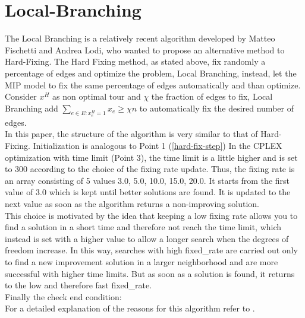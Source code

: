\section{Local-Branching}
The Local Branching is a relatively recent algorithm developed by Matteo Fischetti and Andrea Lodi, who wanted to propose an alternative method to Hard-Fixing. The Hard Fixing method, as stated above, fix randomly a percentage of edges and optimize the problem, Local Branching, instead, let the MIP model to fix the same percentage of edges automatically and than optimize. \\
Consider $ x^H $ as non optimal tour and $ \chi $ the fraction of edges to fix, Local Branching add $ \sum_{ e\in E: x_e^H = 1 } x_e \ge \chi n $ to automatically fix the desired number of edges. \\ 
In this paper, the structure of the algorithm is very similar to that of Hard-Fixing. Initialization is analogous to Point 1 (\ref{hard-fix-step})
In the CPLEX optimization with time limit (Point 3), the time limit is a little higher and is set to 300 according to the choice of the fixing rate update. Thus, the fixing rate is an array consisting of 5 values {3.0, 5.0, 10.0, 15.0, 20.0}. It starts from the first value of 3.0 which is kept until better solutions are found. It is updated to the next value as soon as the algorithm returns a non-improving solution. \\
This choice is motivated by the idea that keeping a low fixing rate allows you to find a solution in a short time and therefore not reach the time limit, which instead is set with a higher value to allow a longer search when the degrees of freedom increase.
In this way, searches with high fixed\_rate are carried out only to find a new improvement solution in a larger neighborhood and are more successful with higher time limits. But as soon as a solution is found, it returns to the low and therefore fast fixed\_rate.\\
Finally the check end condition: \\
For a detailed explanation of the reasons for this algorithm refer to \cite{article}.

